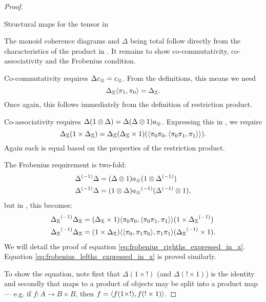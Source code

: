 \begin{proof}
\begin{table}[h!]
\begin{center}
    \end{center}
    \caption{Structural maps for the tensor in \Invc{\X}}
    \label{tab:structural_maps_for_the_tensor_in_invx}
  \end{table}

  The monoid coherence diagrams and $\Delta$ being total follow directly from the characteristics
  of the product in \X. It remains to show co-commutativity, co-associativity and the Frobenius
  condition.

  Co-commutativity requires $\Delta c_{\otimes} = c_{\otimes}$. From the definitions, this means we need
  \[\Delta_{\mathbb{X}} \langle \pi_1,\pi_0\rangle = \Delta_{\mathbb{X}}.\] Once again, this follows immediately from the
  definition of restriction product.

  Co-associativity requires $\Delta (1 \otimes \Delta) = \Delta (\Delta \otimes 1) a_{\otimes}$. Expressing this
  in \X, we require
  \[
    \Delta_{\mathbb{X}} (1 \times \Delta_{\mathbb{X}}) =
      \Delta_{\mathbb{X}}(\Delta_{\mathbb{X}} \times 1) (\langle\pi_0 \pi_0,\langle\pi_0 \pi_1,\pi_1\rangle\rangle).
  \]
  Again each is equal based on the properties of the restriction product.

  The Frobenius requirement is two-fold:
  \begin{align}
    {\Delta}^{(-1)} \Delta &= (\Delta \otimes1) a_{\otimes}(1\otimes{\Delta}^{(-1)}) \label{eq:frobenius_righths_need_in_invx}\\
    {\Delta}^{(-1)} \Delta &= (1 \otimes \Delta) {a_{\otimes}}^{(-1)}({\Delta}^{(-1)}\otimes 1), \label{eq:frobenius_lefths_need_in_invx}
  \end{align}
  but in \X, this becomes:
  \begin{align}
    {\Delta_{\ensuremath{\mathbb{X}}}}^{(-1)} \Delta_{\mathbb{X}}
      &= (\Delta_{\mathbb{X}} \times 1) \langle\pi_0 \pi_0,\langle\pi_0 \pi_1,\pi_1\rangle\rangle(1\times{\Delta_{\ensuremath{\mathbb{X}}}}^{(-1)})
      \label{eq:frobenius_righths_expressed_in_x}\\
    {\Delta_{\mathbb{X}}}^{(-1)}\Delta_{\mathbb{X}}
      &= (1 \times \Delta_{\mathbb{X}}) \langle\langle\pi_0, \pi_1 \pi_0\rangle,\pi_1 \pi_1\rangle({\Delta_{\mathbb{X}}}^{(-1)}\times 1).
      \label{eq:frobenius_lefths_expressed_in_x}
  \end{align}
  We will detail the proof of equation \vref{eq:frobenius_righths_expressed_in_x}. Equation
  \vref{eq:frobenius_lefths_expressed_in_x} is proved similarly.

  To show the equation, note first that $\Delta(1 \times !)$ (and $\Delta(!\times 1)$) is the
  identity and secondly that maps to a product of objects may be split into a product map --- e.g.
  if $f:A \to B \times B$, then $f = \langle f(1\times !), f(!\times 1)\rangle$.


\end{proof}
